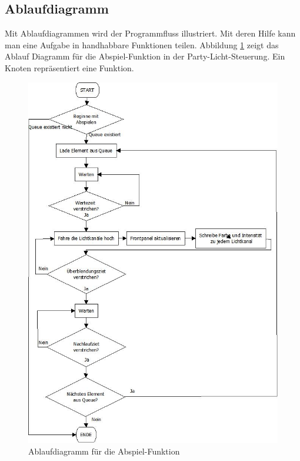 \subsection{Ablaufdiagramm }
Mit Ablaufdiagrammen wird der Programmfluss illustriert. Mit deren Hilfe kann man eine Aufgabe in handhabbare Funktionen teilen. Abbildung \ref{fig:plan01} zeigt das Ablauf Diagramm für die Abspiel-Funktion in der Party-Licht-Steuerung. Ein Knoten repräsentiert eine Funktion.
	\begin{figure}[h!]
	\centering
		\includegraphics[height=0.9\textheight]{Pics/play-flowchart.jpeg}
	\caption{Ablaufdiagramm für die Abspiel-Funktion}
	\label{fig:plan01}
	\end{figure}	
		
